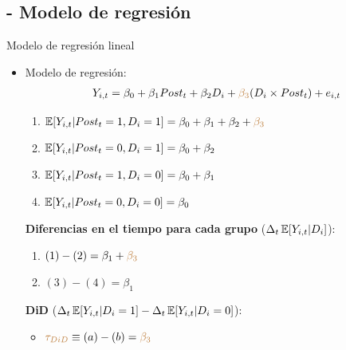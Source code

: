 \documentclass[10pt, xcolor=dvipsnames]{beamer}
\begin{document}
\subsection{- Modelo de regresión}

\begin{frame}{Modelo de regresión lineal}
\begin{itemize}\setlength{\itemsep}{1.0em}
	\item Modelo de regresión:
	\begin{align*}
	Y_{i,t} = \beta_0 + \beta_1 Post_t + \beta_2 D_i + \textcolor{brown}{\beta_3} (D_i \times Post_t) + e_{i,t}
	\end{align*} 
	\pause
	\begin{enumerate}
		\item[1.] $\operatorname{\mathbb{E}}[Y_{i,t}|Post_t=1, D_i = 1] = \beta_0 + \beta_1 + \beta_2 + \textcolor{brown}{\beta_3}$ \\ 
		\pause
		\item[2.] $\operatorname{\mathbb{E}}[Y_{i,t}|Post_t=0, D_i = 1] = \beta_0 + \beta_2$ \\	 
		\pause
		\item[3.] $\operatorname{\mathbb{E}}[Y_{i,t}|Post_t=1, D_i = 0] = \beta_0 + \beta_1$ \\ 	
		\pause
		\item[4.] $\operatorname{\mathbb{E}}[Y_{i,t}|Post_t=0, D_i = 0] = \beta_0$	
	\end{enumerate}
	\pause
	\vspace{0.2cm}	
	\textbf{Diferencias en el tiempo para cada grupo} ($\Delta_t \operatorname{\mathbb{E}}[Y_{i,t}|D_i]$):
	\begin{enumerate}
		\item[a.] $(1)-(2)=\beta_1 + \textcolor{brown}{\beta_3}$ \\
		\item[b.] $(3)-(4)=\beta_1$ \\	
	\end{enumerate}
	\vspace{0.2cm}	
	\pause
	\textbf{DiD} ($\Delta_t \operatorname{\mathbb{E}}[Y_{i,t}|D_i=1]-\Delta_t \operatorname{\mathbb{E}}[Y_{i,t}|D_i=0]$):
	\begin{itemize}
		\item $\textcolor{brown}{\tau_{DiD}} \equiv (a)-(b) = \textcolor{brown}{\beta_3}$ \\
	\end{itemize}
\end{itemize}
\end{frame}
\end{document}
